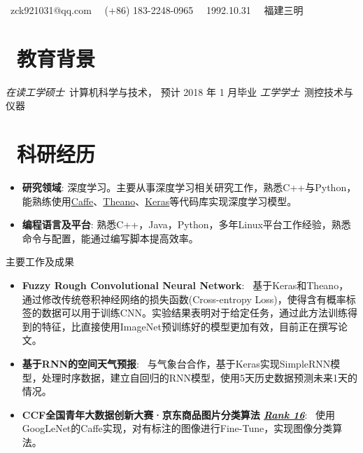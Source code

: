 \documentclass{resume}
\begin{document}

\centerline{\sffamily\large{\faEnvelope\ {zck921031@qq.com} \textperiodcentered\ \faPhone\ {(+86) 183-2248-0965} \textperiodcentered\ \faBirthdayCake\ {1992.10.31} \textperiodcentered\ \faHome\ {福建三明}}
	\vspace{1.5ex} }
 
\section{\faGraduationCap\  教育背景}
\textit{在读工学硕士}\ 计算机科学与技术， 预计 2018 年 1 月毕业
\textit{工学学士}\ 测控技术与仪器

\section{\faSearch\ 科研经历}
\begin{itemize}[parsep=0.5ex]
	\item \textbf{研究领域}:  深度学习。主要从事深度学习相关研究工作，熟悉C++与Python，能熟练使用\href{http://caffe.berkeleyvision.org/}{Caffe}、\href{http://deeplearning.net/software/theano/}{Theano}、\href{https://keras.io/}{Keras}等代码库实现深度学习模型。
	\item \textbf{编程语言及平台}:  熟悉C++，Java，Python，多年Linux平台工作经验，熟悉命令与配置，能通过编写脚本提高效率。
\end{itemize}
主要工作及成果
\begin{itemize}[parsep=0.5ex]
\item \textbf{Fuzzy Rough Convolutional Neural Network}: ~基于Keras和Theano，通过修改传统卷积神经网络的损失函数(Cross-entropy Loss)，使得含有概率标签的数据可以用于训练CNN。实验结果表明对于给定任务，通过此方法训练得到的特征，比直接使用ImageNet预训练好的模型更加有效，目前正在撰写论文。
\item \textbf{基于RNN的空间天气预报}: ~与气象台合作，基于Keras实现SimpleRNN模型，处理时序数据，建立自回归的RNN模型，使用5天历史数据预测未来1天的情况。
\item \textbf{CCF全国青年大数据创新大赛·京东商品图片分类算法 \textit{\href{http://www.wid.org.cn/data/science/player/competition/detail/rank/232}{Rank 16}}}: ~使用GoogLeNet的Caffe实现，对有标注的图像进行Fine-Tune，实现图像分类算法。
\end{itemize}
\end{document}

